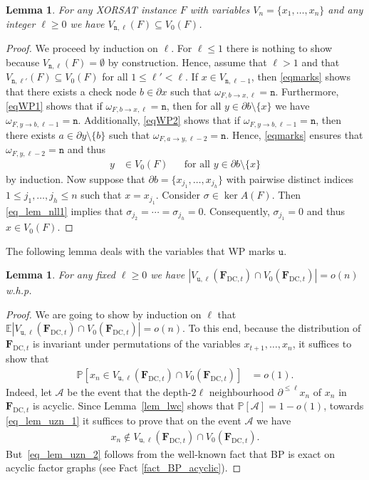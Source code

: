 \documentclass[10pt,reqno]{amsart}
\numberwithin{equation}{section}
\renewcommand{\vec}[1]{\boldsymbol{#1}}
\renewcommand{\subset}{\subseteq}
\newcommand{\FDC}[1]{\PHI_{\mathrm{DC},{#1}}}
\newcommand{\frz}{V_0}
\newcommand{\unfrozen}{\mathtt{u}}
\newcommand{\nll}{\mathtt{n}}
\newcommand{\uzn}{\unfrozen}
\newcommand\PHI{\vec F}
\newcommand\cA{\mathcal A}
\newcommand\Erw{\mathbb{E}}
\newcommand\ex{\Erw}
\newcommand\brk[1]{\left\lbrack{#1}\right\rbrack}
\newcommand{\whp}{w.h.p.}
\newcommand\pr{\mathbb{P}}
\newcommand\Lem{Lemma}
\newtheorem{lemma}[definition]{Lemma}
\def\pr{{\mathbb P}}
\begin{document}
\begin{lemma}\label{lem_nll}
	For any XORSAT instance $F$ with variables $V_n=\{x_1,\ldots,x_n\}$ and any integer $\ell\geq0$ we have $V_{\nll,\ell}(F)\subset\frz(F)$.
\end{lemma}
\begin{proof}
	We proceed by induction on $\ell$.
	For $\ell\leq1$ there is nothing to show because $V_{\nll,\ell}(F)=\emptyset$ by construction.
	Hence, assume that $\ell>1$ and that $V_{\nll,\ell'}(F)\subset\frz(F)$ for all $1\leq\ell'<\ell$.
	If $x\in V_{\nll,\ell-1}$, then \eqref{eqmarks} shows that there exists a check node $b\in\partial x$ such that $\omega_{F,b\to x,\ell}=\nll$.
	Furthermore, \eqref{eqWP1} shows that if $\omega_{F,b\to x,\ell}=\nll$, then for all $y\in\partial b\setminus\{x\}$ we have $\omega_{F,y\to b,\ell-1}=\nll$.
	Additionally, \eqref{eqWP2} shows that if $\omega_{F,y\to b,\ell-1}=\nll$, then there exists $a\in\partial y\setminus\{b\}$ such that $\omega_{F,a\to y,\ell-2}=\nll$.
	Hence, \eqref{eqmarks} ensures that $\omega_{F,y,\ell-2}=\nll$ and thus 
	\begin{align}\label{eq_lem_nll1}
		y&\in V_0(F)&&\mbox{for all }y\in\partial b\setminus\{x\}
	\end{align}
	by induction.
	Now suppose that $\partial b=\{x_{j_1},\ldots,x_{j_h}\}$ with pairwise distinct indices $1\leq j_1,\ldots,j_h\leq n$ such that $x=x_{j_1}$.
	Consider $\sigma\in\ker A(F)$.
	Then \eqref{eq_lem_nll1} implies that $\sigma_{j_2}=\cdots=\sigma_{j_h}=0$.
	Consequently, $\sigma_{j_1}=0$ and thus $x\in V_0(F)$.
\end{proof}

The following lemma deals with the variables that WP marks $\uzn$.

\begin{lemma}\label{lem_uzn}
	For any fixed $\ell\geq0$ we have $|V_{\uzn,\ell}(\FDC{t})\cap\frz(\FDC{t})|=o(n)$ \whp 
\end{lemma}

\newcommand{\nb}{\partial^{\leq\ell}}
\begin{proof}
	We are going to show by induction on $\ell$ that $\ex|V_{\uzn,\ell}(\FDC{t})\cap\frz(\FDC{t})|=o(n)$.
	To this end, because the distribution of $\FDC t$ is invariant under permutations of the variables $x_{t+1},\ldots,x_n$, it suffices to show that
	\begin{align}\label{eq_lem_uzn_1}
		\pr\brk{x_n\in V_{\uzn,\ell}(\FDC{t})\cap\frz(\FDC{t})}&=o(1).
	\end{align}
	Indeed, let $\cA$ be the event that the depth-$2\ell$ neighbourhood $\nb x_n$ of $x_n$ in $\FDC t$ is acyclic.
	Since \Lem~\ref{lem_lwc} shows that $\pr\brk{\cA}=1-o(1)$, towards \eqref{eq_lem_uzn_1} it suffices to prove that on the event $\cA$ we have
	\begin{align}\label{eq_lem_uzn_2}
		x_n\not\in V_{\uzn,\ell}(\FDC{t})\cap\frz(\FDC{t}).
	\end{align}
	But~\eqref{eq_lem_uzn_2} follows from the well-known fact that BP is exact on acyclic factor graphs (see Fact \ref{fact_BP_acyclic}). 
\end{proof}
\end{document}
